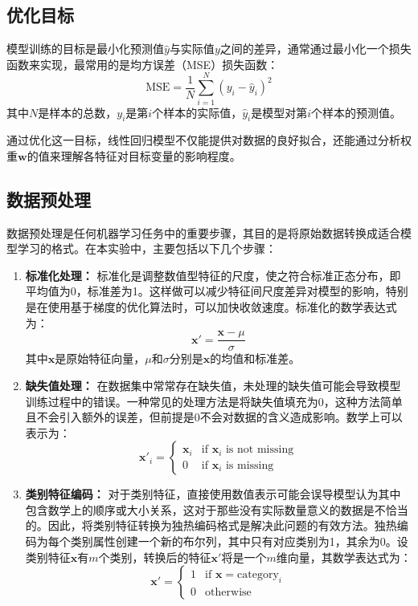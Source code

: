 \documentclass[a4paper,12pt]{article}
\begin{document}
\subsection{优化目标}
模型训练的目标是最小化预测值$\hat{y}$与实际值$y$之间的差异，通常通过最小化一个损失函数来实现，最常用的是均方误差（MSE）损失函数：
\[
\text{MSE} = \frac{1}{N} \sum_{i=1}^{N} (y_i - \hat{y}_i)^2
\]
其中$N$是样本的总数，$y_i$是第$i$个样本的实际值，$\hat{y}_i$是模型对第$i$个样本的预测值。

通过优化这一目标，线性回归模型不仅能提供对数据的良好拟合，还能通过分析权重$\mathbf{w}$的值来理解各特征对目标变量的影响程度。





\subsection{数据预处理}
数据预处理是任何机器学习任务中的重要步骤，其目的是将原始数据转换成适合模型学习的格式。在本实验中，主要包括以下几个步骤：

\begin{enumerate}
	\item \textbf{标准化处理：} 标准化是调整数值型特征的尺度，使之符合标准正态分布，即平均值为0，标准差为1。这样做可以减少特征间尺度差异对模型的影响，特别是在使用基于梯度的优化算法时，可以加快收敛速度。标准化的数学表达式为：
	\[
	\mathbf{x}' = \frac{\mathbf{x} - \mu}{\sigma}
	\]
	其中$\mathbf{x}$是原始特征向量，$\mu$和$\sigma$分别是$\mathbf{x}$的均值和标准差。
	
	\item \textbf{缺失值处理：} 在数据集中常常存在缺失值，未处理的缺失值可能会导致模型训练过程中的错误。一种常见的处理方法是将缺失值填充为0，这种方法简单且不会引入额外的误差，但前提是0不会对数据的含义造成影响。数学上可以表示为：
	\[
	\mathbf{x}'_i = \begin{cases} 
		\mathbf{x}_i & \text{if } \mathbf{x}_i \text{ is not missing} \\
		0 & \text{if } \mathbf{x}_i \text{ is missing}
	\end{cases}
	\]
	
	\item \textbf{类别特征编码：} 对于类别特征，直接使用数值表示可能会误导模型认为其中包含数学上的顺序或大小关系，这对于那些没有实际数量意义的数据是不恰当的。因此，将类别特征转换为独热编码格式是解决此问题的有效方法。独热编码为每个类别属性创建一个新的布尔列，其中只有对应类别为1，其余为0。设类别特征$\mathbf{x}$有$m$个类别，转换后的特征$\mathbf{x}'$将是一个$m$维向量，其数学表达式为：
	\[
	\mathbf{x}' = \begin{cases} 
		1 & \text{if } \mathbf{x} = \text{category}_i \\
		0 & \text{otherwise}
	\end{cases}
	\]
\end{enumerate}
\end{document}
